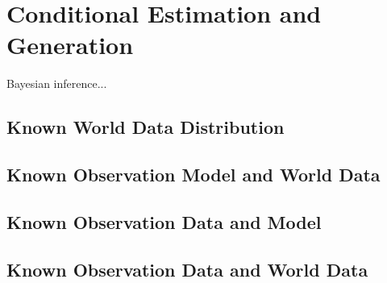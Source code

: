 \documentclass[../../book-main.tex]{subfiles}
\begin{document}
\chapter{Conditional Estimation and Generation}

Bayesian inference...


\section{Known World Data Distribution}

\section{Known Observation Model and World Data}

\section{Known Observation Data and Model}

\section{Known Observation Data and World Data}
\end{document}
